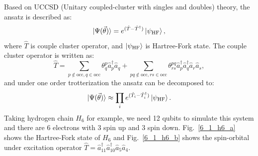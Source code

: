 Based on UCCSD (Unitary coupled-cluster with singles and doubles) theory, the ansatz is described as:
\begin{equation}
    |\Psi(\vec{\theta})\rangle = e^{(\hat{T}-\hat{T}^\dagger)}\ket{\psi_\text{HF}},
\end{equation}
where $\hat{T}$ is couple cluster operator, and $\ket{\psi_\text{HF}}$ is Hartree-Fork state. The couple cluster operator is written as:
\begin{equation}
    \hat{T}=\sum_{p\notin\text{occ},q\in\text{occ}}\theta_q^p \hat{a}_p^\dagger \hat{a}_q + \sum_{pq\notin\text{occ},rs\in\text{occ}}\theta_{rs}^{pq}\hat{a}_p^\dagger \hat{a}_q^\dagger \hat{a}_r \hat{a}_s,
\end{equation}
and under one order trotterization the ansatz can be decomposed to:
\begin{equation}
    |\Psi(\vec{\theta})\rangle\approx \prod_ie^{(\hat{T}_i-\hat{T}_i^\dagger)}\ket{\psi_\text{HF}}.
\end{equation}
Taking hydrogen chain $H_6$ for example, we need 12 qubits to simulate this system and there are 6 electrons with 3 spin up and 3 spin down. Fig.~\ref{6_1_h6_a} shows the Hartree-Fork state of $H_6$ and Fig.~\ref{6_1_h6_b} shows the spin-orbital under excitation operator $\hat{T}=\hat{a}_{11}^\dagger \hat{a}_{10}^\dagger \hat{a}_5 \hat{a}_4$.
